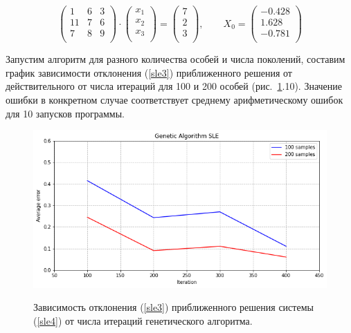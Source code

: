 \documentclass[12pt, a4paper]{article}
\begin{document}
    \begin{equation}
        \left(
        \begin{array} {ccc}
            1 & 6 & 3 \\
            11 & 7 & 6 \\
            7 & 8 & 9 \\
        \end{array}
        \right)
        \cdot
        \left(
        \begin{array} {ccc}
            x_{1} \\
            x_{2} \\
            x_{3} \\
        \end{array}
        \right)
        =
        \left(
        \begin{array} {ccc}
            7 \\
            2 \\
            3 \\
        \end{array}
        \right), 
        \qquad
        X_{0} =
        \left(
        \begin{array} {ccc}
            -0.428 \\
            1.628 \\
            -0.781 \\
        \end{array}
        \right)
        \label{sle4}
    \end{equation}
    
    Запустим алгоритм для разного количества особей и числа поколений, 
    составим график зависимости отклонения (\ref{sle3}) приближенного 
    решения от действительного от числа итераций для 100 и 200 особей 
    (рис.~\ref{image411}.10). Значение ошибки в конкретном случае 
    соответствует среднему арифметическому ошибок для 10 запусков программы.
    
    \begin{figure}[h!]
        \center
        \includegraphics[width = 13cm]{sle1_3.png}
        \label{image411}
        \caption{Зависимость отклонения (\ref{sle3}) приближенного решения  
            системы (\ref{sle4}) от числа итераций генетического алгоритма.}
    \end{figure}
    
\end{document}
